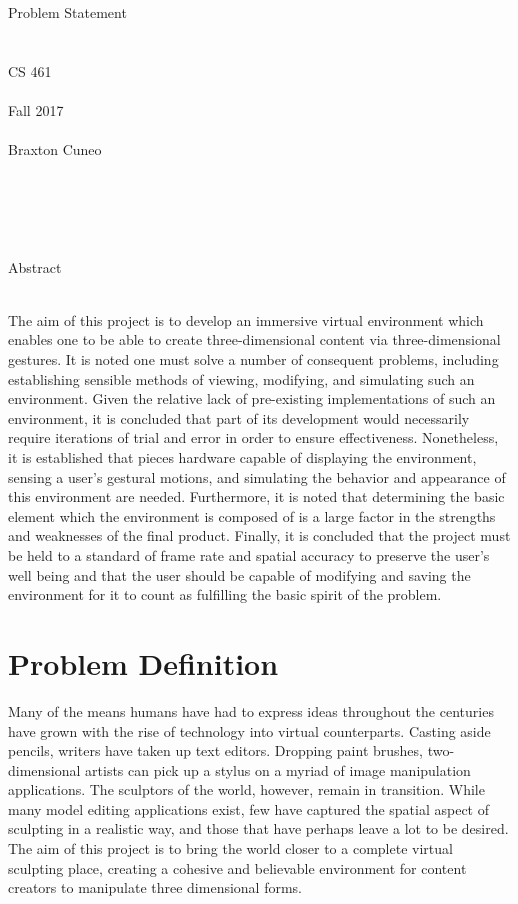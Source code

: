 \documentclass[letterpaper,10pt,titlepage]{article}
\begin{document}
\begingroup
\center
~\\~\\~\\~\\~\\
\LARGE{Problem Statement}\\~\\~\\
\large{CS 461}\\~\\
\large{Fall 2017}\\~\\
\large{Braxton Cuneo}\\~\\~\\~\\~\\~\\
\large{Abstract}\\~\\
\endgroup

\begingroup
The aim of this project is to develop an immersive virtual environment which enables one to be able to create three-dimensional content via three-dimensional gestures. It is noted one must solve a number of consequent problems, including establishing sensible methods of viewing, modifying, and simulating such an environment. Given the relative lack of pre-existing implementations of such an environment, it is concluded that part of its development would necessarily require iterations of trial and error in order to ensure effectiveness. Nonetheless, it is established that pieces hardware capable of displaying the environment, sensing a user's gestural motions, and simulating the behavior and appearance of this environment are needed. Furthermore, it is noted that determining the basic element which the environment is composed of is a large factor in the strengths and weaknesses of the final product. Finally, it is concluded that the project must be held to a standard of frame rate and spatial accuracy to preserve the user's well being and that the user should be capable of modifying and saving the environment for it to count as fulfilling the basic spirit of the problem.
\endgroup

\newpage
\section{Problem Definition}

Many of the means humans have had to express ideas throughout the centuries have grown with the rise of technology into virtual counterparts. Casting aside pencils, writers have taken up text editors. Dropping paint brushes, two-dimensional artists can pick up a stylus on a myriad of image manipulation applications. The sculptors of the world, however, remain in transition. While many model editing applications exist, few have captured the spatial aspect of sculpting in a realistic way, and those that have perhaps leave a lot to be desired. The aim of this project is to bring the world closer to a complete virtual sculpting place, creating a cohesive and believable environment for content creators to manipulate three dimensional forms.
\end{document}
